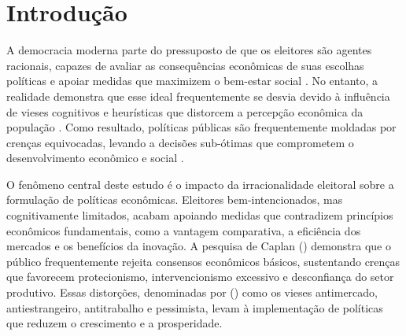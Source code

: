 

\chapter{Introdução} %


A democracia moderna parte do pressuposto de que os eleitores são agentes racionais, capazes de avaliar as consequências econômicas de suas escolhas políticas e apoiar medidas que maximizem o bem-estar social \cite{downs1957economic}. No entanto, a realidade demonstra que esse ideal frequentemente se desvia devido à influência de vieses cognitivos e heurísticas que distorcem a percepção econômica da população \cite{The_Myth_of_the_Rational_Voter,kahneman2011thinking}. Como resultado, políticas públicas são frequentemente moldadas por crenças equivocadas, levando a decisões sub-ótimas que comprometem o desenvolvimento econômico e social \cite{acemoglu2019narrow}.

O fenômeno central deste estudo é o impacto da irracionalidade eleitoral sobre a formulação de políticas econômicas. Eleitores bem-intencionados, mas cognitivamente limitados, acabam apoiando medidas que contradizem princípios econômicos fundamentais, como a vantagem comparativa, a eficiência dos mercados e os benefícios da inovação. A pesquisa de Caplan (\citeyear{Systematically_Biased_Beliefs_about_Economics,The_Myth_of_the_Rational_Voter}) demonstra que o público frequentemente rejeita consensos econômicos básicos, sustentando crenças que favorecem protecionismo, intervencionismo excessivo e desconfiança do setor produtivo. Essas distorções, denominadas por  (\citeyear{The_Myth_of_the_Rational_Voter}) como os vieses antimercado, antiestrangeiro, antitrabalho e pessimista, levam à implementação de políticas que reduzem o crescimento e a prosperidade.

